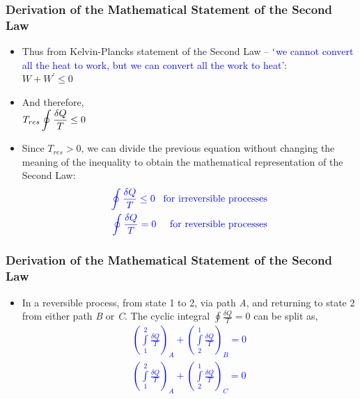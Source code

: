 \documentclass[10pt,compress,handout,ignorenonframetext]{beamer}
\begin{document}
\begin{frame}
 \frametitle{Derivation of the Mathematical Statement of the Second Law}
   \begin{itemize}
    \item <1-> Thus from Kelvin-Plancks statement of the Second Law -- \textcolor{blue}{$\lq$we cannot convert all the heat to work, but we can convert all the work to heat'}:\\
             $W + W^{\prime} \leq 0$
    \item <2-> And therefore,\\
             $T_{res} \displaystyle\displaystyle\oint \displaystyle\frac{\delta Q}{T} \leq 0$
    \item <3->  Since $T_{res} > 0$, we can divide the previous equation without changing the meaning of the inequality to obtain the mathematical representation of the Second Law:
             \begin{eqnarray}
             \textcolor{blue}{\displaystyle\oint \displaystyle\frac{\delta Q}{T} \leq 0 \;\;\; \text{for irreversible processes}} \nonumber \\
             \textcolor{blue}{\displaystyle\oint \displaystyle\frac{\delta Q}{T} = 0 \;\;\;\;\; \text{for reversible processes}} \nonumber 
             \end{eqnarray}
   \end{itemize}
 \normalsize
\end{frame}


\begin{frame}
 \frametitle{Derivation of the Mathematical Statement of the Second Law}
   \begin{itemize}
    \item <3-> In a reversible process, from state 1 to 2, via path {\it A}, and returning to state 2 from either path {\it B} or {\it C}. The cyclic integral $\displaystyle\oint\displaystyle\frac{\delta Q}{T} = 0$ can be split as,
         \textcolor{blue}{\begin{eqnarray}
          \left( \displaystyle\int\limits_{1}^{2} \displaystyle\frac{\delta Q}{T} \right)_{A} + \left( \displaystyle\int\limits_{2}^{1} \displaystyle\frac{\delta Q}{T} \right)_{B} = 0 \nonumber \\
          \left( \displaystyle\int\limits_{1}^{2} \displaystyle\frac{\delta Q}{T} \right)_{A} + \left( \displaystyle\int\limits_{2}^{1} \displaystyle\frac{\delta Q}{T} \right)_{C} = 0 \nonumber 
         \end{eqnarray}}
   \end{itemize}
 \normalsize
    
\end{frame}
\end{document}
